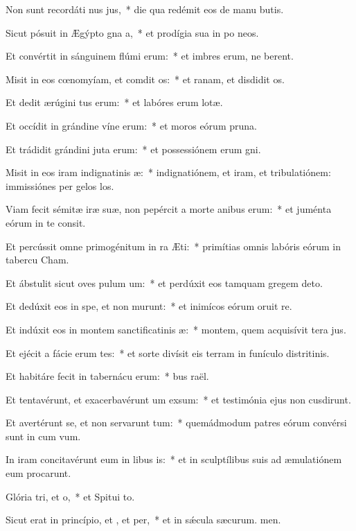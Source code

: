 \item Non sunt recordáti nus jus,~* die qua redémit eos de manu butis.
\item Sicut pósuit in Ægýpto gna a,~* et prodígia sua in po neos.
\item Et convértit in sánguinem flúmi erum:~* et imbres erum, ne berent.
\item Misit in eos cœnomyíam, et comdit os:~* et ranam, et disdidit os.
\item Et dedit ærúgini tus erum:~* et labóres erum lotæ.
\item Et occídit in grándine víne erum:~* et moros eórum  pruna.
\item Et trádidit grándini juta erum:~* et possessiónem erum gni.
\item Misit in eos iram indignatinis æ:~* indignatiónem, et iram, et tribulatiónem: immissiónes per gelos los.
\item Viam fecit sémitæ iræ suæ, non pepércit a morte anibus erum:~* et juménta eórum in te consit.
\item Et percússit omne primogénitum in ra Æti:~* primítias omnis labóris eórum in tabercu Cham.
\item Et ábstulit sicut oves pulum um:~* et perdúxit eos tamquam gregem  deto.
\item Et dedúxit eos in spe, et non murunt:~* et inimícos eórum oruit re.
\item Et indúxit eos in montem sanctificatinis æ:~* montem, quem acquisívit tera jus.
\item Et ejécit a fácie erum tes:~* et sorte divísit eis terram in funículo distritinis.
\item Et habitáre fecit in tabernácu erum:~* bus raël.
\item Et tentavérunt, et exacerbavérunt um exsum:~* et testimónia ejus non cusdirunt.
\item Et avertérunt se, et non servarunt tum:~* quemádmodum patres eórum convérsi sunt in cum vum.
\item In iram concitavérunt eum in libus is:~* et in sculptílibus suis ad æmulatiónem eum procarunt.
\item Glória tri, et o,~* et Spitui to.
\item Sicut erat in princípio, et , et per,~* et in sǽcula sæcurum. men.
